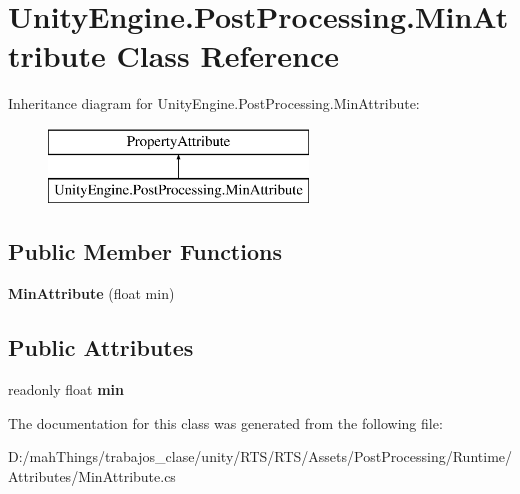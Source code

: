 \hypertarget{class_unity_engine_1_1_post_processing_1_1_min_attribute}{}\section{Unity\+Engine.\+Post\+Processing.\+Min\+Attribute Class Reference}
\label{class_unity_engine_1_1_post_processing_1_1_min_attribute}
Inheritance diagram for Unity\+Engine.\+Post\+Processing.\+Min\+Attribute\+:\begin{figure}[H]
\begin{center}
\leavevmode
\includegraphics[height=2.000000cm]{class_unity_engine_1_1_post_processing_1_1_min_attribute}
\end{center}
\end{figure}
\subsection*{Public Member Functions}
\begin{DoxyCompactItemize}
\item 
\mbox{\label{class_unity_engine_1_1_post_processing_1_1_min_attribute_ad7f32ba10ec48ba5d4b9eb31e43d1f5a}} 
{\bfseries Min\+Attribute} (float min)
\end{DoxyCompactItemize}
\subsection*{Public Attributes}
\begin{DoxyCompactItemize}
\item 
\mbox{\label{class_unity_engine_1_1_post_processing_1_1_min_attribute_abb5d80c69026f677751e55a30bfc2e84}} 
readonly float {\bfseries min}
\end{DoxyCompactItemize}


The documentation for this class was generated from the following file\+:\begin{DoxyCompactItemize}
\item 
D\+:/mah\+Things/trabajos\+\_\+clase/unity/\+R\+T\+S/\+R\+T\+S/\+Assets/\+Post\+Processing/\+Runtime/\+Attributes/Min\+Attribute.\+cs\end{DoxyCompactItemize}
